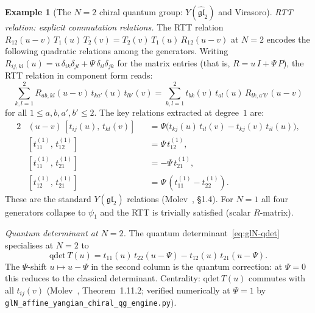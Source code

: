 \documentclass[11pt,reqno]{amsart}
\theoremstyle{definition}
\newtheorem{example}[theorem]{Example}
\theoremstyle{remark}
\numberwithin{equation}{section}
\begin{document}
\begin{example}[The $N = 2$ chiral quantum group:
$Y(\widehat{\mathfrak{gl}}_2)$ and Virasoro]
\medskip
\emph{RTT relation: explicit commutation relations.}
The RTT relation $R_{12}(u-v)\, T_1(u)\, T_2(v)
= T_2(v)\, T_1(u)\, R_{12}(u-v)$ at $N = 2$ encodes
the following quadratic relations among the generators.
Writing $R_{ij,kl}(u) = u\,\delta_{ik}\delta_{jl}
+ \Psi\,\delta_{il}\delta_{jk}$
for the matrix entries (that is, $R = u\, I + \Psi\, P$),
the RTT relation in component form
reads:
\begin{equation}\label{eq:gl2-rtt-components}
  \sum_{k,l = 1}^{2}
  R_{ab,kl}(u-v)\, t_{ka'}(u)\, t_{lb'}(v)
  = \sum_{k,l = 1}^{2}
  t_{bk}(v)\, t_{al}(u)\, R_{lk,a'b'}(u-v)
\end{equation}
for all $1 \leq a,b,a',b' \leq 2$.
The key relations extracted at degree~$1$ are:
\begin{alignat}{2}\label{eq:gl2-rtt-degree1}
  &(u - v)\,[t_{ij}(u),\, t_{kl}(v)]
  &&= \Psi\bigl(
    t_{kj}(u)\, t_{il}(v)
    - t_{kj}(v)\, t_{il}(u)
  \bigr), \\
  \label{eq:gl2-rtt-offdiag}
  &[t_{11}^{(1)},\, t_{12}^{(1)}]
  &&= \Psi\, t_{12}^{(1)}, \\
  \label{eq:gl2-rtt-offdiag2}
  &[t_{11}^{(1)},\, t_{21}^{(1)}]
  &&= -\Psi\, t_{21}^{(1)}, \\
  \label{eq:gl2-rtt-cross}
  &[t_{12}^{(1)},\, t_{21}^{(1)}]
  &&= \Psi\,
    (t_{11}^{(1)} - t_{22}^{(1)}).
\end{alignat}
These are the standard $Y(\mathfrak{gl}_2)$
relations (Molev~\cite{Molev07}, \S1.4). For $N = 1$ all
four generators collapse to $\psi_1$ and the RTT is trivially
satisfied (scalar $R$-matrix).

\medskip
\emph{Quantum determinant at $N = 2$.}
The quantum determinant~\eqref{eq:glN-qdet} specialises at
$N = 2$ to
\begin{equation}\label{eq:gl2-qdet}
  \mathrm{qdet}\, T(u)
  = t_{11}(u)\, t_{22}(u - \Psi)
  - t_{12}(u)\, t_{21}(u - \Psi).
\end{equation}
The $\Psi$-shift $u \mapsto u - \Psi$ in the second column
is the quantum correction: at $\Psi = 0$ this reduces to
the classical determinant. Centrality: $\mathrm{qdet}\, T(u)$
commutes with all $t_{ij}(v)$
(Molev~\cite{Molev07}, Theorem~1.11.2; verified
numerically at $\Psi = 1$ by
\texttt{glN\_affine\_yangian\_chiral\_qg\_engine.py}).


\end{example}
\end{document}
